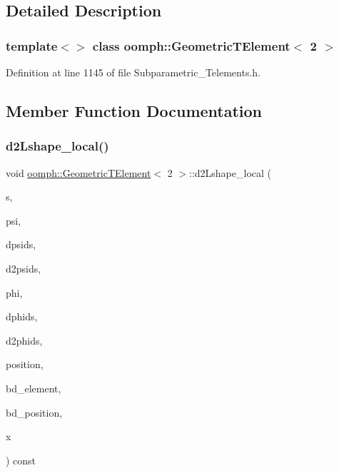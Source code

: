 \subsection{Detailed Description}
\subsubsection*{template$<$$>$\newline
class oomph\+::\+Geometric\+T\+Element$<$ 2 $>$}



Definition at line 1145 of file Subparametric\+\_\+\+Telements.\+h.



\subsection{Member Function Documentation}
\mbox{\label{classoomph_1_1GeometricTElement_3_012_01_4_ab842b93f817d9b14c133d555bec8c373}} 
\subsubsection{\texorpdfstring{d2\+Lshape\+\_\+local()}{d2Lshape\_local()}}
{\footnotesize\ttfamily void \hyperlink{classoomph_1_1GeometricTElement}{oomph\+::\+Geometric\+T\+Element}$<$ 2 $>$\+::d2\+Lshape\+\_\+local (\begin{DoxyParamCaption}\item[{const \hyperlink{classoomph_1_1Vector}{Vector}$<$ double $>$ \&}]{s,  }\item[{\hyperlink{classoomph_1_1Shape}{Shape} \&}]{psi,  }\item[{\hyperlink{classoomph_1_1DShape}{D\+Shape} \&}]{dpsids,  }\item[{\hyperlink{classoomph_1_1DShape}{D\+Shape} \&}]{d2psids,  }\item[{\hyperlink{classoomph_1_1Shape}{Shape} \&}]{phi,  }\item[{\hyperlink{classoomph_1_1DShape}{D\+Shape} \&}]{dphids,  }\item[{\hyperlink{classoomph_1_1DShape}{D\+Shape} \&}]{d2phids,  }\item[{\hyperlink{classoomph_1_1DenseMatrix}{Dense\+Matrix}$<$ double $>$ \&}]{position,  }\item[{unsigned \&}]{bd\+\_\+element,  }\item[{\hyperlink{classoomph_1_1DenseMatrix}{Dense\+Matrix}$<$ double $>$ \&}]{bd\+\_\+position,  }\item[{\hyperlink{classoomph_1_1Vector}{Vector}$<$ double $>$ \&}]{x }\end{DoxyParamCaption}) const\hspace{0.3cm}{\ttfamily [inline]}}

